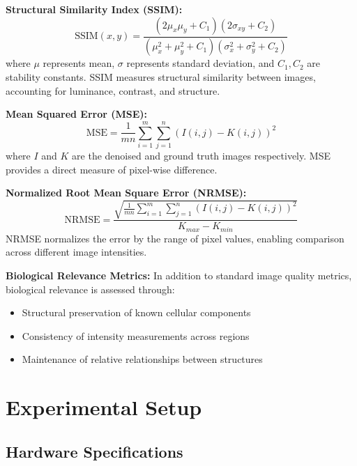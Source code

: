 \documentclass[12pt,a4paper]{report}
\begin{document}
\vspace{0.5cm}

\textbf{Structural Similarity Index (SSIM):}
\begin{equation}
\text{SSIM}(x,y) = \frac{(2\mu_x\mu_y + C_1)(2\sigma_{xy} + C_2)}{(\mu_x^2 + \mu_y^2 + C_1)(\sigma_x^2 + \sigma_y^2 + C_2)}
\end{equation}
where $\mu$ represents mean, $\sigma$ represents standard deviation, and $C_1, C_2$ are stability constants. SSIM measures structural similarity between images, accounting for luminance, contrast, and structure.

\vspace{0.5cm}

\textbf{Mean Squared Error (MSE):}
\begin{equation}
\text{MSE} = \frac{1}{mn}\sum_{i=1}^{m}\sum_{j=1}^{n}(I(i,j) - K(i,j))^2
\end{equation}
where $I$ and $K$ are the denoised and ground truth images respectively. MSE provides a direct measure of pixel-wise difference.

\vspace{0.5cm}

\textbf{Normalized Root Mean Square Error (NRMSE):}
\begin{equation}
\text{NRMSE} = \frac{\sqrt{\frac{1}{mn}\sum_{i=1}^{m}\sum_{j=1}^{n}(I(i,j) - K(i,j))^2}}{K_{max} - K_{min}}
\end{equation}
NRMSE normalizes the error by the range of pixel values, enabling comparison across different image intensities.

\vspace{0.5cm}

\textbf{Biological Relevance Metrics:} In addition to standard image quality metrics, biological relevance is assessed through:
\begin{itemize}
    \item Structural preservation of known cellular components
    \item Consistency of intensity measurements across regions
    \item Maintenance of relative relationships between structures
\end{itemize}

\chapter{Experimental Setup}
\label{chap:experimental}

\section{Hardware Specifications}
\end{document}
